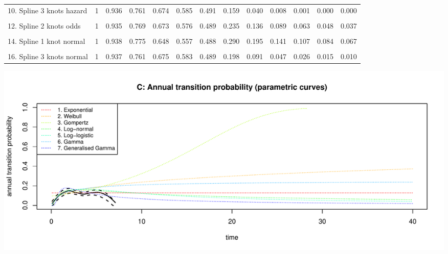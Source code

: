 \documentclass[
]{article}
\begin{document}
\begin{table}
{\begin{tabular}[t]{lrrrrrrrrrrrr}
10. Spline 3 knots hazard & 1 & 0.936 & 0.761 & 0.674 & 0.585 & 0.491 & 0.159 & 0.040 & 0.008 & 0.001 & 0.000 & 0.000\\
\cellcolor{gray!6}{11. Spline 1 knot odds} & \cellcolor{gray!6}{1} & \cellcolor{gray!6}{0.939} & \cellcolor{gray!6}{0.778} & \cellcolor{gray!6}{0.648} & \cellcolor{gray!6}{0.556} & \cellcolor{gray!6}{0.489} & \cellcolor{gray!6}{0.301} & \cellcolor{gray!6}{0.213} & \cellcolor{gray!6}{0.162} & \cellcolor{gray!6}{0.131} & \cellcolor{gray!6}{0.109} & \cellcolor{gray!6}{0.093}\\
12. Spline 2 knots odds & 1 & 0.935 & 0.769 & 0.673 & 0.576 & 0.489 & 0.235 & 0.136 & 0.089 & 0.063 & 0.048 & 0.037\\
\cellcolor{gray!6}{13. Spline 3 knots odds} & \cellcolor{gray!6}{1} & \cellcolor{gray!6}{0.937} & \cellcolor{gray!6}{0.761} & \cellcolor{gray!6}{0.675} & \cellcolor{gray!6}{0.583} & \cellcolor{gray!6}{0.489} & \cellcolor{gray!6}{0.207} & \cellcolor{gray!6}{0.108} & \cellcolor{gray!6}{0.066} & \cellcolor{gray!6}{0.044} & \cellcolor{gray!6}{0.032} & \cellcolor{gray!6}{0.024}\\
14. Spline 1 knot normal & 1 & 0.938 & 0.775 & 0.648 & 0.557 & 0.488 & 0.290 & 0.195 & 0.141 & 0.107 & 0.084 & 0.067\\
\cellcolor{gray!6}{15. Spline 2 knots normal} & \cellcolor{gray!6}{1} & \cellcolor{gray!6}{0.930} & \cellcolor{gray!6}{0.773} & \cellcolor{gray!6}{0.669} & \cellcolor{gray!6}{0.572} & \cellcolor{gray!6}{0.489} & \cellcolor{gray!6}{0.240} & \cellcolor{gray!6}{0.135} & \cellcolor{gray!6}{0.083} & \cellcolor{gray!6}{0.054} & \cellcolor{gray!6}{0.037} & \cellcolor{gray!6}{0.026}\\
16. Spline 3 knots normal & 1 & 0.937 & 0.761 & 0.675 & 0.583 & 0.489 & 0.198 & 0.091 & 0.047 & 0.026 & 0.015 & 0.010\\
\bottomrule
\end{tabular}}
\end{table}

\begin{flushleft}\includegraphics[height=0.29\textheight]{Images/validate_extrapolation2-3} \end{flushleft}
\end{document}
